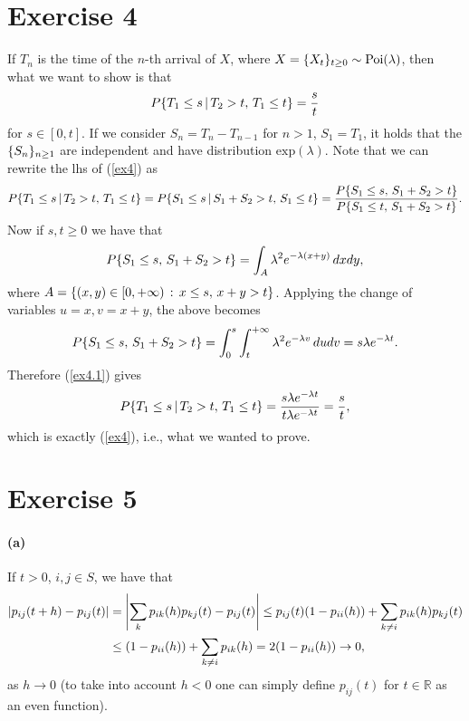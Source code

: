 \documentclass[a4paper,11pt]{article}
\theoremstyle{definition}
\theoremstyle{plain}
\theoremstyle{remark}
\DeclarePairedDelimiter{\abs}{\lvert}{\rvert}
\DeclarePairedDelimiter{\bra}{\lbrace}{\rbrace}
\begin{document}
\section*{Exercise 4}

If $T_n$ is the time of the $n$-th arrival of $X$, where $X=\bra{X_t}_{t\geq0}\sim\mathrm{Poi}(\lambda)$, then what we want to show is that 
\begin{equation}\label{ex4}
P\bra{T_1\leq s\,|\,T_2>t,\,T_1\leq t} = \frac{s}{t}
\end{equation}
for $s\in[0,t]$. If we consider $S_n=T_n-T_{n-1}$ for $n>1$, $S_1=T_1$, it holds that the $\bra{S_n}_{n\geq1}$ are independent and have distribution $\mathrm{exp}(\lambda)$. Note that we can rewrite the lhs of (\ref{ex4}) as
\begin{equation}\label{ex4.1}
P\bra{T_1\leq s\,|\,T_2>t,\,T_1\leq t} = P\bra{S_1\leq s\,|\,S_1+S_2>t,\,S_1\leq t} = \frac{P\bra{S_1\leq s,\,S_1+S_2>t}}{P\bra{S_1\leq t,\,S_1+S_2>t}}.
\end{equation}
Now if $s,t\geq 0$ we have that
$$
P\bra{S_1\leq s,\,S_1+S_2>t} = \int_A \lambda^2e^{-\lambda(x+y)}\,dxdy,
$$
where $A=\bra{(x,y)\in[0,+\infty)\,:\,x\leq s,\,x+y>t}$. Applying the change of variables $u=x,v=x+y$, the above becomes
$$
P\bra{S_1\leq s,\,S_1+S_2>t} = \int_0^s\int_t^{+\infty} \lambda^2e^{-\lambda v}\,dudv = s\lambda e^{-\lambda t}.
$$
Therefore (\ref{ex4.1}) gives
$$
P\bra{T_1\leq s\,|\,T_2>t,\,T_1\leq t} = \frac{s\lambda e^{-\lambda t}}{t\lambda e^{-\lambda t}} = \frac{s}{t},
$$
which is exactly (\ref{ex4}), i.e., what we wanted to prove.

\section*{Exercise 5}

\paragraph*{(a)}

If $t>0$, $i,j\in S$, we have that
\begin{align*}
\abs{p_{ij}(t+h)-p_{ij}(t)} & = \abs*{\sum_kp_{ik}(h)p_{kj}(t)-p_{ij}(t)} \leq p_{ij}(t)(1-p_{ii}(h)) + \sum_{k\neq i}p_{ik}(h)p_{kj}(t) \\ & \leq (1-p_{ii}(h)) + \sum_{k\neq i}p_{ik}(h) = 2(1-p_{ii}(h)) \to 0,
\end{align*}
as $h\to0$ (to take into account $h<0$ one can simply define $p_{ij}(t)$ for $t\in\mathbb{R}$ as an even function).
\end{document}
